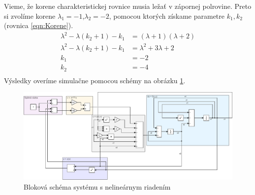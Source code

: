 \documentclass[../main.tex]{subfiles}
\begin{document}
Vieme, že korene charakteristickej rovnice musia ležať v zápornej polrovine. Preto si zvolíme korene $\lambda_1 = -1$,$\lambda_2 = -2$, pomocou ktorých získame parametre $k_1,k_2$ (rovnica \ref{eqn:Korene}).
\begin{equation}
\begin{aligned} 
\lambda^2 - \lambda(k_2+1) - k_1 & = (\lambda + 1)(\lambda + 2)\\ 
\lambda^2 - \lambda(k_2+1) - k_1 & = \lambda^2 + 3\lambda + 2\\ 
k_1 &= -2\\
k_2 &= -4\\
\end{aligned}
\label{eqn:Korene}
\end{equation}
Výsledky overíme simulačne pomocou schémy na obrázku \ref{fig:PrikladsRiadenim}.
\newpage
\begin{figure}[H]
	\begin{center}\includegraphics[scale=0.8,angle=90]{Rovnica1MVS.pdf}\end{center}
	\caption{Bloková schéma systému s nelineárnym riadením}
	\label{fig:PrikladsRiadenim}
\end{figure}
\end{document}

